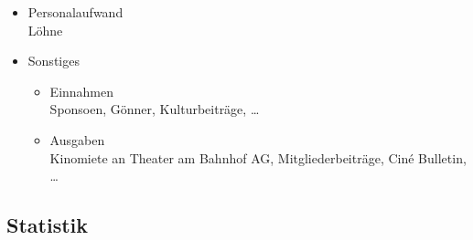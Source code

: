 \documentclass[
]{article}
\providecommand{\tightlist}{%
  \setlength{\itemsep}{0pt}\setlength{\parskip}{0pt}}
\begin{document}
\begin{itemize}
  \begin{itemize}
  \tightlist
  \item
    Einnahmen\\
    Die Werbeeinnahme aus Kinowerbung druch Trailers, Dias für
    Sponsoren, \ldots{}
  \item
    Ausgaben\\
    Inserate, Drucksachen, Homepage, \ldots{}
  \end{itemize}
\item
  Personalaufwand\\
  Löhne
\item
  Sonstiges

  \begin{itemize}
  \tightlist
  \item
    Einnahmen\\
    Sponsoen, Gönner, Kulturbeiträge, \ldots{}
  \item
    Ausgaben\\
    Kinomiete an Theater am Bahnhof AG, Mitgliederbeiträge, Ciné
    Bulletin, \ldots{}
  \end{itemize}
\end{itemize}

\subsection{Statistik}\label{statistik}
\end{document}
